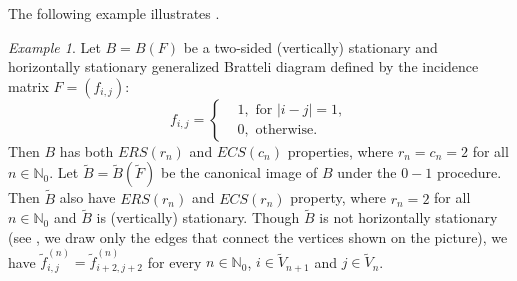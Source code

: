\documentclass[11pt,reqno]{amsart}
\theoremstyle{definition}
\theoremstyle{remark}
\newtheorem{example}[definition]{Example}
\theoremstyle{plain}
\def\tl{\widetilde}
\newcommand{\N}{\mathbb N}
\numberwithin{equation}{section}
\begin{document}
The following example illustrates .

\begin{example}\label{ex:0-1proc}
Let $B = B(F)$ be a two-sided (vertically) stationary and horizontally stationary generalized Bratteli diagram defined by the incidence matrix $F = (f_{i,j})$:
$$
f_{i,j} = 
\left\{
\begin{aligned}
& 1, \mbox{ for } |i - j| = 1,\\
& 0, \mbox{ otherwise. }
\end{aligned}
\right.
$$
Then $B$ has both $ERS(r_n)$ and $ ECS(c_n)$ properties, where $r_n = c_n =2$ for all $n \in \N_0$. Let $\tl B = \tl B(\tl F)$ be the canonical image of $B$ under the $0-1$ procedure. Then $\tl B$ also have $ ERS(r_n)$ and $ ECS(r_n)$ property, where $r_n = 2$ for all $n \in \N_0$ and $\tl B$ is (vertically) stationary. Though $\tl B$ is not horizontally stationary (see , we draw only the edges that connect the vertices shown on the picture), we have $\tl f_{i,j}^{(n)} = \tl f_{i+2,j+2}^{(n)}$ for every $n \in \N_0$, $i \in \tl V_{n+1}$ and $j \in \tl V_n$.

\begin{figure}
\centering
\begin{minipage}[c]{0.45\textwidth}
\centering
{}
\end{minipage}
\end{figure}
\end{example}
\end{document}

